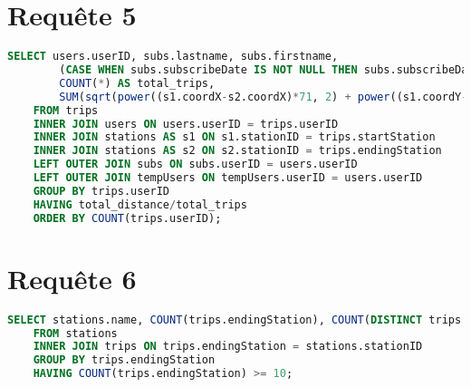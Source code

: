 \documentclass[a4paper,11pt]{report}
\begin{document}
\section{Requ\^ete 5}
    \begin{lstlisting}[language=sql]
    SELECT users.userID, subs.lastname, subs.firstname,
        (CASE WHEN subs.subscribeDate IS NOT NULL THEN subs.subscribeDate ELSE tempUsers.paymentDate END) AS subscribeDate,
        COUNT(*) AS total_trips,
        SUM(sqrt(power((s1.coordX-s2.coordX)*71, 2) + power((s1.coordY-s2.coordY)*111, 2))) AS total_distance
    FROM trips
    INNER JOIN users ON users.userID = trips.userID
    INNER JOIN stations AS s1 ON s1.stationID = trips.startStation
    INNER JOIN stations AS s2 ON s2.stationID = trips.endingStation
    LEFT OUTER JOIN subs ON subs.userID = users.userID
    LEFT OUTER JOIN tempUsers ON tempUsers.userID = users.userID
    GROUP BY trips.userID
    HAVING total_distance/total_trips
    ORDER BY COUNT(trips.userID);
    \end{lstlisting}


\section{Requ\^ete 6}
    \begin{lstlisting}[language=sql]
    SELECT stations.name, COUNT(trips.endingStation), COUNT(DISTINCT trips.userID)
    FROM stations
    INNER JOIN trips ON trips.endingStation = stations.stationID
    GROUP BY trips.endingStation
    HAVING COUNT(trips.endingStation) >= 10;
    \end{lstlisting}
\end{document}
